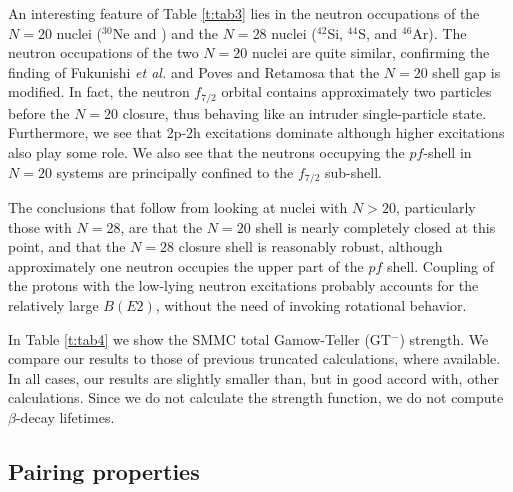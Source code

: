 \begin{multicols}{2}
An interesting feature of Table \ref{t:tab3} lies in the neutron
occupations of the $N = 20$ nuclei ($^{30}$Ne and ) and the $N =
28$ nuclei ($^{42}$Si, $^{44}$S, and $^{46}$Ar).  The neutron
occupations of the two $N = 20$ nuclei are quite similar, confirming
the finding of Fukunishi {\it et al.} \cite{r:fukunishi} and Poves and
Retamosa \cite{r:poves1} that the $N= 20$ shell gap is modified.  In
fact, the neutron $f_{7/2}$ orbital contains approximately two
particles before the $N=20$ closure, thus behaving like an intruder
single-particle state.  Furthermore, we see that 2p-2h excitations
dominate although higher excitations also play some role.  We also see
that the neutrons occupying the $pf$-shell in $N=20$ systems are
principally confined to the $f_{7/2}$ sub-shell.

The conclusions that follow from looking at nuclei with $N > 20$,
particularly those with $N = 28$, are that the $N = 20$ shell is nearly
completely closed at this point, and that the $N=28$ closure shell is
reasonably robust, although approximately one neutron occupies the upper
part of the $pf$ shell. Coupling of the protons with the low-lying
neutron excitations probably accounts for the relatively large
$B(E2)$, without the need of invoking rotational behavior.

In Table \ref{t:tab4} we show the SMMC total Gamow-Teller (GT$^-$)
strength.  We compare our results to those of previous truncated
calculations, where available.  In all cases, our results are slightly
smaller than, but in good accord with, other calculations.  Since we
do not calculate the strength function, we do not compute
$\beta$-decay lifetimes.


\subsection{Pairing properties}


\end{multicols}
